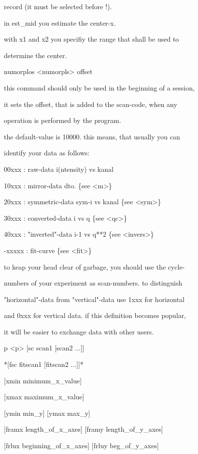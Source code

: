 \documentclass[]{article}
\begin{document}
record (it must be selected before !).

in est\_mid you estimate the center-x.

with x1 and x2 you specifiy the range that shall be used to

determine the center.

numorplos \textless{}numorpls\textgreater{} offset

this command should only be used in the beginning of a session,

it sets the offset, that is added to the scan-code, when any

operation is performed by the program.

the default-value is 10000. this means, that usually you can

identify your data as follows:

00xxx : raw-data i(ntensity) vs kanal

10xxx : mirror-data dto. \{see \textless{}m\textgreater{}\}

20xxx : symmetric-data sym-i vs kanal \{see
\textless{}sym\textgreater{}\}

30xxx : converted-data i vs q \{see \textless{}qc\textgreater{}\}

40xxx : "inverted"-data i-1 vs q**2 \{see
\textless{}invers\textgreater{}\}

-xxxxx : fit-curve \{see \textless{}fit\textgreater{}\}

to keap your head clear of garbage, you should use the cycle-

numbers of your experiment as scan-numbers. to distinguish

"horizontal"-data from "vertical"-data use 1xxx for horizontal

and 0xxx for vertical data. if this definition becomes popular,

it will be easier to exchange data with other users.

p \textless{}p\textgreater{} {[}sc scan1 {[}scan2 ...{]}{]}

*{[}fsc fitscan1 {[}fitscan2 ...{]}{]}*

{[}xmin minimum\_x\_value{]}

{[}xmax maximum\_x\_value{]}

{[}ymin min\_y{]} {[}ymax max\_y{]}

{[}framx length\_of\_x\_axes{]} {[}framy length\_of\_y\_axes{]}

{[}frlux beginning\_of\_x\_axes{]} {[}frluy beg\_of\_y\_axes{]}
\end{document}
